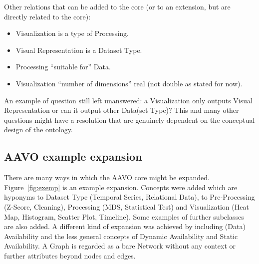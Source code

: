 \documentclass[12pt,fleqn]{article}
\begin{document}
Other relations that can be added to the core (or to an extension, but
are directly related to the core):
\begin{itemize}
	\item Visualization is a type of Processing.
	\item Visual Representation is a Dataset Type.
	\item Processing ``suitable for'' Data.
	\item Visualization ``number of dimensions'' real (not double as stated for now).
% 
% 
% 
% 
%
\end{itemize}

An example of question still left unanswered:
a Visualization only outputs Visual Representation
or can it output other Data(set Type)?
This and many other questions might have a resolution
that are genuinely dependent on the conceptual design of the ontology.


\subsection{AAVO example expansion}\label{sec:ext}
There are many ways in which the AAVO core might be expanded.
Figure~\ref{fig:exemp} is an example expansion.
Concepts were added which are hyponyms to Dataset Type (Temporal Series, Relational Data),
to Pre-Processing (Z-Score, Cleaning), Processing (MDS, Statistical Test)
and Visualization (Heat Map, Histogram, Scatter Plot, Timeline).
Some examples of further subclasses are also added.
A different kind of expansion was achieved by including (Data) Availability
and the less general concepts of Dynamic Availability and Static Availability.
A Graph is regarded as a bare Network without any context or further attributes beyond
nodes and edges.
\end{document}
